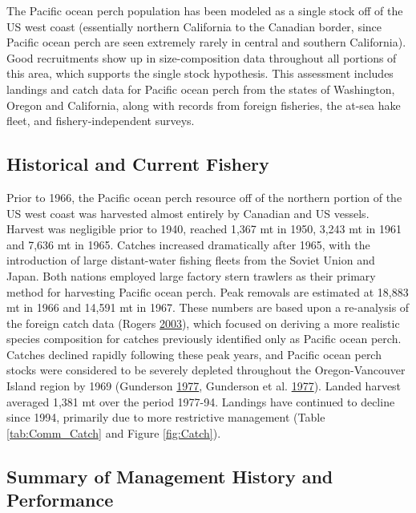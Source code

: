 \documentclass[12pt,]{article}
\begin{document}
The Pacific ocean perch population has been modeled as a single stock
off of the US west coast (essentially northern California to the
Canadian border, since Pacific ocean perch are seen extremely rarely in
central and southern California). Good recruitments show up in
size-composition data throughout all portions of this area, which
supports the single stock hypothesis. This assessment includes landings
and catch data for Pacific ocean perch from the states of Washington,
Oregon and California, along with records from foreign fisheries, the
at-sea hake fleet, and fishery-independent surveys.

\subsection{Historical and Current
Fishery}\label{historical-and-current-fishery}

Prior to 1966, the Pacific ocean perch resource off of the northern
portion of the US west coast was harvested almost entirely by Canadian
and US vessels. Harvest was negligible prior to 1940, reached 1,367 mt
in 1950, 3,243 mt in 1961 and 7,636 mt in 1965. Catches increased
dramatically after 1965, with the introduction of large distant-water
fishing fleets from the Soviet Union and Japan. Both nations employed
large factory stern trawlers as their primary method for harvesting
Pacific ocean perch. Peak removals are estimated at 18,883 mt in 1966
and 14,591 mt in 1967. These numbers are based upon a re-analysis of the
foreign catch data (Rogers
\protect\hyperlink{ref-rogers_species_2003}{2003}), which focused on
deriving a more realistic species composition for catches previously
identified only as Pacific ocean perch. Catches declined rapidly
following these peak years, and Pacific ocean perch stocks were
considered to be severely depleted throughout the Oregon-Vancouver
Island region by 1969 (Gunderson
\protect\hyperlink{ref-gunderson_population_1977}{1977}, Gunderson et
al. \protect\hyperlink{ref-gunderson_status_1977}{1977}). Landed harvest
averaged 1,381 mt over the period 1977-94. Landings have continued to
decline since 1994, primarily due to more restrictive management (Table
\ref{tab:Comm_Catch} and Figure \ref{fig:Catch}).

\subsection{Summary of Management History and
Performance}\label{summary-of-management-history-and-performance}
\end{document}
